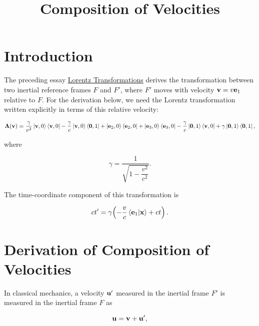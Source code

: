 \documentclass[12pt]{article}
\title{Composition of Velocities}
\author{}
\date{}
\begin{document}
\maketitle

\section{Introduction}

The preceding essay \href{/physics/relativity/special-relativity/lorentz-transformations}{Lorentz Transformations}
derives the transformation between two inertial reference frames $F$ and $F'$, where $F'$ moves
with velocity $\vb{v}=v\vb{e}_1$ relative to $F$. For the derivation below, we need the Lorentz
transformation written explicitly in terms of this relative velocity:

\begin{equation}
  \boldsymbol{\Lambda}(\vb{v})
  =
    \frac{\gamma}{v^2}\ket{\vb{v},0}\bra{\vb{v},0}
    - \frac{\gamma}{c}\ket{\vb{v},0}\bra{\vb{0},1}
    + \ket{\vb{e}_2,0}\bra{\vb{e}_2,0}
    + \ket{\vb{e}_3,0}\bra{\vb{e}_3,0}
    - \frac{\gamma}{c}\ket{\vb{0},1}\bra{\vb{v},0}
    + \gamma\ket{\vb{0},1}\bra{\vb{0},1},
  \label{eq:Lorentz_transformation_in_velocity_form}
\end{equation}

where

\[
  \gamma
  =
  \frac{1}{\sqrt{1-\dfrac{v^2}{c^2}}}.
\]

The time-coordinate component of this transformation is

\begin{equation}
  ct'
  =
  \gamma\!\left(
    -\frac{v}{c}\ip{\vb{e}_1}{\vb{x}} + ct
  \right).
  \label{eq:Lorentz_time_coordinate}
\end{equation}

\section{Derivation of Composition of Velocities}

In classical mechanics, a velocity $\vb{u}'$ measured in the inertial frame $F'$ is measured
in the inertial frame $F$ as

\[
\vb{u} = \vb{v} + \vb{u}',
\]
\end{document}
